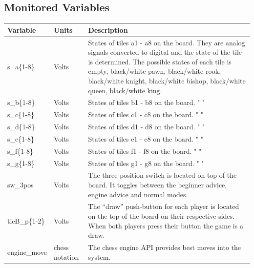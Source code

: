 \documentclass[12pt]{article}
\begin{document}
{\subsection{Monitored Variables}

\begin{table}[H]
  \centering
      \setlength{\leftmargini}{0.4cm}
      \begin{tabular}{| >{\centering\arraybackslash}m{2.5cm} | 
        >{\centering\arraybackslash}m{2cm} | 
        >{\centering\arraybackslash}m{9cm} |}
      \hline
      \rowcolor[gray]{0.9}
      Variable & Units & Description\\
      \hline
      s\_a\{1-8\} & Volts & States of tiles a1 - a8 on the board. They are analog signals 
      converted to digital and the state of the tile is determined. The possible states of 
      each tile is empty, black/white pawn, black/white rook, black/white knight, 
      black/white bishop, black/white queen, black/white king. \\
      \hline
      s\_b\{1-8\} & Volts & States of tiles b1 - b8 on the board. " " \\
      \hline
      s\_c\{1-8\} & Volts & States of tiles c1 - c8 on the board. " " \\
      \hline
      s\_d\{1-8\} & Volts & States of tiles d1 - d8 on the board. " " \\
      \hline
      s\_e\{1-8\} & Volts & States of tiles e1 - e8 on the board. " " \\
      \hline
      s\_f\{1-8\} & Volts & States of tiles f1 - f8 on the board. " " \\
      \hline
      s\_g\{1-8\} & Volts & States of tiles g1 - g8 on the board. " " \\
      \hline
      sw\_3pos & Volts & The three-position switch is located
      on top of the board. It toggles between the beginner 
      advice, engine advice and normal modes.\\
      \hline
      tieB\_p\{1-2\} & Volts & The ``draw'' push-button for each player is located on 
      the top of the board on their respective sides. When both players press their button
      the game is a draw. \\
      \hline
      engine\_move & chess notation & The chess engine API provides best moves into 
      the system. \\
      \hline 
      \end{tabular}
  \label{Table}
  \end{table}

}
\end{document}
